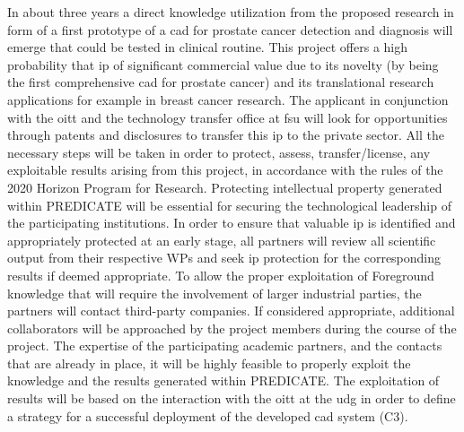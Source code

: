 In about three years a direct knowledge utilization from the proposed research in form of a first prototype of a \ac{cad} for prostate cancer detection and diagnosis will emerge that could be tested in clinical routine.
This project offers a high probability that \ac{ip} of significant commercial value due to its novelty (by being the first comprehensive \ac{cad} for prostate cancer) and its translational research applications for example in breast cancer research.
The applicant in conjunction with the \ac{oitt} and the technology transfer office at \ac{fsu} will look for opportunities through patents and disclosures to transfer this \ac{ip} to the private sector.
All the necessary steps will be taken in order to protect, assess, transfer/license, any exploitable results arising from this project, in accordance with the rules of the 2020 Horizon Program for Research.
Protecting intellectual property generated within PREDICATE will be essential for securing the technological leadership of the participating institutions.
In order to ensure that valuable \ac{ip} is identified and appropriately protected at an early stage, all partners will review all scientific output from their respective WPs and seek \ac{ip} protection for the corresponding results if deemed appropriate.
To allow the proper exploitation of Foreground knowledge that will require the involvement of larger industrial parties, the partners will contact third-party companies.
If considered appropriate, additional collaborators will be approached by the project members during the course of the project.
The expertise of the participating academic partners, and the contacts that are already in place, it will be highly feasible to properly exploit the knowledge and the results generated within PREDICATE.
The exploitation of results will be based on the interaction with the \ac{oitt} at the \ac{udg} in order to define a strategy for a successful deployment of the developed \ac{cad} system (C3).




